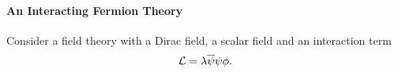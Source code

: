 \paragraph{An Interacting Fermion Theory}
Consider a field theory with a Dirac field, a scalar field and an interaction term
\begin{align*}
	\mathcal{L} = \lambda\overline{\psi}\psi\phi.
\end{align*}